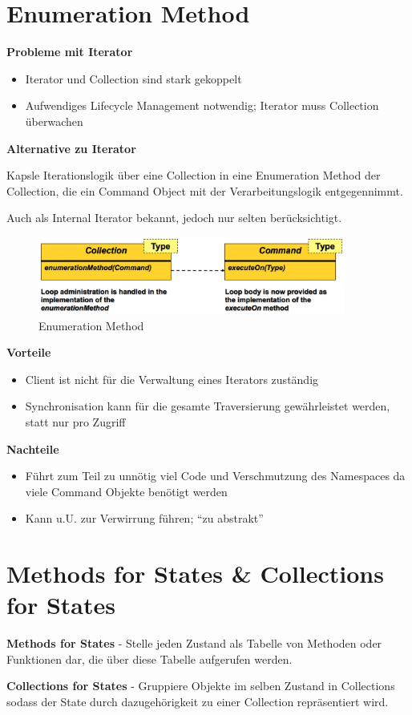 \section{Enumeration Method}

\textbf{Probleme mit Iterator}

\begin{itemize}
	\item Iterator und Collection sind stark gekoppelt
	\item Aufwendiges Lifecycle Management notwendig; Iterator muss Collection überwachen
\end{itemize}

\textbf{Alternative zu Iterator}

Kapsle Iterationslogik über eine Collection in eine Enumeration Method der Collection, die ein Command Object mit der Verarbeitungslogik entgegennimmt.

Auch als Internal Iterator bekannt, jedoch nur selten berücksichtigt.

\begin{figure}[H]
	\centering
	\includegraphics[width=0.9\textwidth]{content/advancedPatterns/enumerationmethod.png}
	\caption{Enumeration Method}
\end{figure}

\textbf{Vorteile}

\begin{itemize}
	\item Client ist nicht für die Verwaltung eines Iterators zuständig
	\item Synchronisation kann für die gesamte Traversierung gewährleistet werden, statt nur pro Zugriff
\end{itemize}

\textbf{Nachteile}

\begin{itemize}
	\item Führt zum Teil zu unnötig viel Code und Verschmutzung des Namespaces da viele Command Objekte benötigt werden
	\item Kann u.U. zur Verwirrung führen; ``zu abstrakt''
\end{itemize}


\section{Methods for States & Collections for States}

\textbf{Methods for States} - Stelle jeden Zustand als Tabelle von Methoden oder Funktionen dar, die über diese Tabelle aufgerufen werden.

\textbf{Collections for States} - Gruppiere Objekte im selben Zustand in Collections sodass der State durch dazugehörigkeit zu einer Collection repräsentiert wird.

